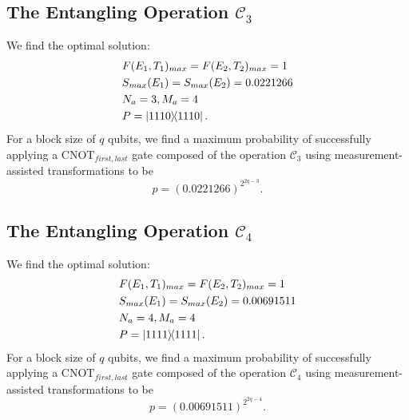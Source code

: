 \documentclass[aps,pra,twocolumn,showpacs,superscriptaddress,floatfix,10pt]{revtex4}
\begin{document}
\subsection{The Entangling Operation $\mathcal{C}_3$}
We find the optimal solution:
\begin{eqnarray}
& F(E_1,T_1)_{max} = F(E_2,T_2)_{max} = 1 \nonumber \\
& S_{max}(E_1) = S_{max}(E_2) = 0.0221266 \\
& N_a = 3,M_a=4 \nonumber \\
& P = \outerproduct{1110}{1110} .\nonumber	
\end{eqnarray}
For a block size of $q$ qubits, we find a maximum probability of successfully applying a $\mbox{CNOT}_{first,last}$ gate composed of the operation $\mathcal{C}_3$ using measurement-assisted transformations to be
\begin{equation}
\label{1C4T Result}
p = (0.0221266)^{2^{2q-3}}.
\end{equation}
\subsection{The Entangling Operation $\mathcal{C}_4$}
We find the optimal solution:
 \begin{eqnarray}
 & F(E_1,T_1)_{max} = F(E_2,T_2)_{max} = 1 \nonumber\\
 & S_{max}(E_1) = S_{max}(E_2) = 0.00691511 \\
 & N_a = 4,M_a=4 \nonumber\\
 & P = \outerproduct{1111}{1111}. \nonumber	
 \end{eqnarray}
For a block size of $q$ qubits, we find a maximum probability of successfully applying a $\mbox{CNOT}_{first,last}$ gate composed of the operation $\mathcal{C}_4$ using measurement-assisted transformations to be
 \begin{equation}
 \label{2C4T Result}
 p = (0.00691511)^{2^{2q-4}}.
 \end{equation}
\end{document}
